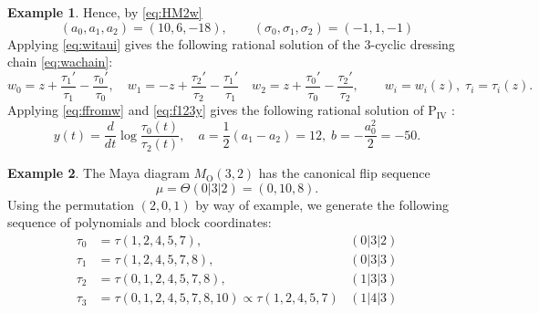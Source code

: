 \documentclass{amsart}
\theoremstyle{definition}
\newtheorem*{example}{Example} %
\newcommand{\PIV}{$\mathrm{P}_{\mathrm{IV}}\,\,$}
\newcommand{\MO}{\operatorname{O}}
\begin{document}
\begin{example}
\noindent
Hence, by \eqref{eq:HM2w}
\[ (a_0,a_1,a_2) = (10,6,-18),\qquad (\sigma_0,\sigma_1,\sigma_2) =
  (-1,1,-1)\] Applying \eqref{eq:witaui} gives the following rational
solution of the 3-cyclic dressing chain \eqref{eq:wachain}:
\[
  w_0 = z + \frac{\tau_1'}{\tau_1} - \frac{\tau_{0}'}{\tau_{0}},\quad
  w_1 = -z + \frac{\tau_2'}{\tau_2} - \frac{\tau_{1}'}{\tau_{1}}\quad
  w_2 = z + \frac{\tau_0'}{\tau_0} - \frac{\tau_{2}'}{\tau_{2}},\qquad
  w_i=w_i(z),\; \tau_i = \tau_i(z).
\]
Applying \eqref{eq:ffromw} and \eqref{eq:f123y} gives the following
rational solution of \PIV:
\[ y(t) = \frac{d}{dt} \log \frac{\tau_0(t)}{\tau_2(t)},\quad a= \frac12(a_1-a_2)=12,\;
  b=-\frac{a_0^2}{2} = -50 .\]
\end{example}

\begin{example}
  The Maya diagram $M_{\MO}(3,2)$ has the canonical flip sequence
  \[ \mu=\Theta(0|3|2)=(0,10,8).\] Using the permutation $(2,0,1)$ by
  way of example, we generate the following sequence of polynomials
  and block coordinates:
\begin{align*}
  \tau_0 &= \tau(1,2,4,5,7), & (0|3|2)\\
  \tau_1 &= \tau(1,2,4,5,7,8), & (0|3|3)\\
  \tau_2 &= \tau(0,1,2,4,5,7,8), & (1|3|3)\\
  \tau_3 &= \tau(0,1,2,4,5,7,8,10)\propto
           \tau(1,2,4,5,7) & (1|4|3)\\
\end{align*}
\begin{figure}[ht]
  \centering
{}
\end{figure}
\end{example}
\end{document}
